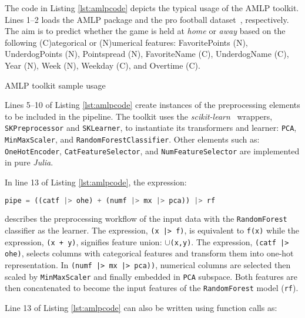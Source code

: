 \documentclass{juliacon}
\begin{document}
The code in Listing \ref{lst:amlpcode} depicts the typical usage of the
AMLP toolkit. Lines 1--2 loads the AMLP package and the pro football
dataset~\cite{profb2014, openml}, respectively.  The aim is to predict whether
the game is held at \emph{home} or \emph{away} based on the following
(C)ategorical or (N)umerical features: FavoritePoints (N), UnderdogPoints
(N), Pointspread (N), FavoriteName (C), UnderdogName (C), Year (N), Week (N),
Weekday (C), and Overtime (C).

\vskip 6pt

\begin{lstfloat}[htbp]
  
  \caption{AMLP toolkit sample usage}
  \label{lst:amlpcode}
\end{lstfloat}

Lines 5--10 of Listing \ref{lst:amlpcode} create instances of the preprocessing
elements to be included in the pipeline.  The toolkit uses the
\emph{scikit-learn}~\cite{pedregosa2011} wrappers, \texttt{SKPreprocessor} and
\texttt{SKLearner}, to instantiate its transformers and learner: \texttt{PCA},
\texttt{MinMaxScaler}, and \texttt{RandomForestClassifier}. Other elements such
as: \texttt{OneHotEncoder}, \texttt{CatFeatureSelector}, and
\texttt{NumFeatureSelector} are implemented in pure \emph{Julia}.

\vskip 6pt

In line 13 of Listing \ref{lst:amlpcode}, the expression:

\begin{lstlisting}[language = Julia,numbers=none]
pipe = ((catf |> ohe) + (numf |> mx |> pca)) |> rf
\end{lstlisting}

describes the preprocessing workflow of the input data with the
\texttt{RandomForest} classifier as the learner.  The expression,
\texttt{(x~|>~f)}, is equivalent to \texttt{f(x)} while the expression,
\texttt{(x~+~y)}, signifies feature union: \texttt{$\cup$(x,y)}.  The
expression, \texttt{(catf |> ohe)}, selects columns with categorical features
and transform them into one-hot representation. In \texttt{(numf |> mx |>
pca))}, numerical columns are selected then scaled by \texttt{MinMaxScaler} and
finally embedded in \texttt{PCA} subspace.  Both features are then concatenated
to become the input features of the \texttt{RandomForest} model (\texttt{rf}).

\vskip 6pt

Line 13 of Listing \ref{lst:amlpcode} can also be written using
function calls as:
\end{document}
